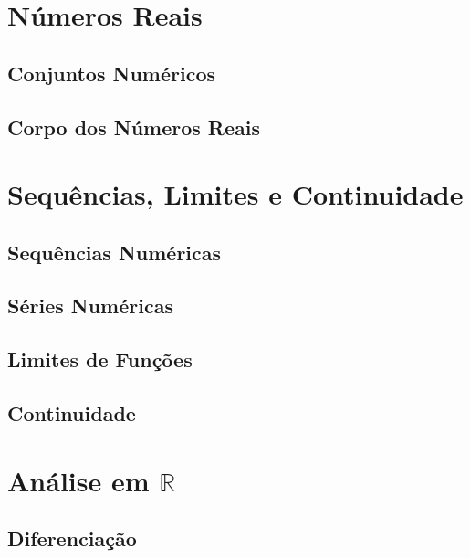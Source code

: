 \documentclass[a5paper, 12pt]{book}
\begin{document}
\maketitle

\pagebreak

\tableofcontents

\part{Números Reais}

\chapter{Conjuntos Numéricos}




\chapter{Corpo dos Números Reais}





\part{Sequências, Limites e Continuidade}

\chapter{Sequências Numéricas}
\chapter{Séries Numéricas}
\chapter{Limites de Funções}
\chapter{Continuidade}

\part{Análise em $\mathbb{R}$}

\chapter{Diferenciação}
\end{document}
